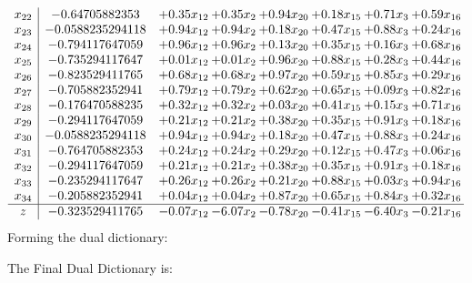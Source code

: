 \documentclass[8pt]{article}
\begin{document}
\[\begin{array}{c| c c@{\hskip 2pt} c@{\hskip 2pt} c@{\hskip 2pt} c@{\hskip 2pt} c@{\hskip 2pt} c@{\hskip 2pt} }
 x_{22}   &  -0.64705882353 & +  0.35 x_{12} & +  0.35 x_{2} & +  0.94 x_{20} & +  0.18 x_{15} & +  0.71 x_{3} & +  0.59 x_{16}\\
 x_{23}   &  -0.0588235294118 & +  0.94 x_{12} & +  0.94 x_{2} & +  0.18 x_{20} & +  0.47 x_{15} & +  0.88 x_{3} & +  0.24 x_{16}\\
 x_{24}   &  -0.794117647059 & +  0.96 x_{12} & +  0.96 x_{2} & +  0.13 x_{20} & +  0.35 x_{15} & +  0.16 x_{3} & +  0.68 x_{16}\\
 x_{25}   &  -0.735294117647 & +  0.01 x_{12} & +  0.01 x_{2} & +  0.96 x_{20} & +  0.88 x_{15} & +  0.28 x_{3} & +  0.44 x_{16}\\
 x_{26}   &  -0.823529411765 & +  0.68 x_{12} & +  0.68 x_{2} & +  0.97 x_{20} & +  0.59 x_{15} & +  0.85 x_{3} & +  0.29 x_{16}\\
 x_{27}   &  -0.705882352941 & +  0.79 x_{12} & +  0.79 x_{2} & +  0.62 x_{20} & +  0.65 x_{15} & +  0.09 x_{3} & +  0.82 x_{16}\\
 x_{28}   &  -0.176470588235 & +  0.32 x_{12} & +  0.32 x_{2} & +  0.03 x_{20} & +  0.41 x_{15} & +  0.15 x_{3} & +  0.71 x_{16}\\
 x_{29}   &  -0.294117647059 & +  0.21 x_{12} & +  0.21 x_{2} & +  0.38 x_{20} & +  0.35 x_{15} & +  0.91 x_{3} & +  0.18 x_{16}\\
 x_{30}   &  -0.0588235294118 & +  0.94 x_{12} & +  0.94 x_{2} & +  0.18 x_{20} & +  0.47 x_{15} & +  0.88 x_{3} & +  0.24 x_{16}\\
 x_{31}   &  -0.764705882353 & +  0.24 x_{12} & +  0.24 x_{2} & +  0.29 x_{20} & +  0.12 x_{15} & +  0.47 x_{3} & +  0.06 x_{16}\\
 x_{32}   &  -0.294117647059 & +  0.21 x_{12} & +  0.21 x_{2} & +  0.38 x_{20} & +  0.35 x_{15} & +  0.91 x_{3} & +  0.18 x_{16}\\
 x_{33}   &  -0.235294117647 & +  0.26 x_{12} & +  0.26 x_{2} & +  0.21 x_{20} & +  0.88 x_{15} & +  0.03 x_{3} & +  0.94 x_{16}\\
 x_{34}   &  -0.205882352941 & +  0.04 x_{12} & +  0.04 x_{2} & +  0.87 x_{20} & +  0.65 x_{15} & +  0.84 x_{3} & +  0.32 x_{16}\\
\hline
z    &  -0.323529411765 & -0.07 x_{12} & -6.07 x_{2} & -0.78 x_{20} & -0.41 x_{15} & -6.40 x_{3} & -0.21 x_{16}\\
\end{array}\]
Forming the dual dictionary:

The Final Dual Dictionary is: 
\end{document}
